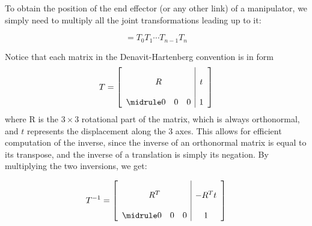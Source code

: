 To obtain the position of the end effector (or any other link) of a manipulator, we simply need to multiply all the joint transformations leading up to it:

\begin{equation}
  [T] = T_0T_1\cdots T_{n-1}T_n
\end{equation}

Notice that each matrix in the Denavit-Hartenberg convention is in form
\[
    T = \begin{bmatrix}
        \begin{array}{c|c}
           \begin{matrix}
              & & & \\
              & & R & & \\
              & & &
           \end{matrix}
            & t \\
        \midrule
        \begin{matrix}
              0 & 0 & 0 \\
           \end{matrix}
            & 1 \\
        \end{array}
    \end{bmatrix}
\]
\noindent where R is the $3\times3$ rotational part of the matrix, which is always orthonormal, and $t$ represents the displacement along the 3 axes. This allows for efficient computation of the inverse, since the inverse of an orthonormal matrix is equal to its transpose, and the inverse of a translation is simply its negation. By multiplying the two inversions, we get:

\[
    T^{-1} = \begin{bmatrix}
        \begin{array}{c|c}
           \begin{matrix}
              & & & \\
              & & R^T & & \\
              & & &
           \end{matrix}
            & -R^{T}t \\
        \midrule
        \begin{matrix}
              0 & 0 & 0 \\
           \end{matrix}
            & 1 \\
        \end{array}
    \end{bmatrix}
\]

